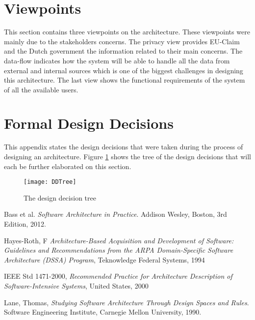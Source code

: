 \documentclass{article}
\begin{document}


\section{Viewpoints}

This section contains three viewpoints on the architecture. These viewpoints were mainly due to the stakeholders concerns. The privacy view provides EU-Claim and the Dutch government the information related to their
main concerns. The data-flow indicates how the system will be able to handle all the data from external and internal sources which is one of the biggest challenges in designing this architecture. The last view shows the functional
requirements of the system of all the available users. 


%






\appendix



\clearpage
\section{Formal Design Decisions}

This appendix states the design decisions that were taken during the process of designing an architecture. Figure \ref{fig:ddtree} shows the tree of the design decisions that will each be further elaborated on this section. 

\begin{figure}[!ht]
\texttt{[image: DDTree]}
\caption{The design decision tree}
\label{fig:ddtree}
\end{figure}

\clearpage

\newpage

\newpage
%

\newpage
%

\newpage

\newpage

\newpage

\newpage

\clearpage


\clearpage
\begin{thebibliography}{9}

Bass et al.
  \emph{Software Architecture in Practice}.
  Addison Wesley, Boston,
  3rd Edition,
  2012.

 Hayes-Roth, F
 \emph{Architecture-Based Acquisition and Development of Software: Guidelines and Recommendations from the ARPA Domain-Speciﬁc
 Software Architecture (DSSA) Program},
 Teknowledge Federal Systems,
 1994

 IEEE Std 1471-2000,
 \emph{Recommended Practice for Architecture Description of Software-Intensive Systems},
 United States,
 2000

  Lane, Thomas,
  \emph{Studying Software Architecture Through Design Spaces and Rules}.
  Software Engineering Institute, Carnegie Mellon University,
  1990.

\end{thebibliography}
\end{document}
